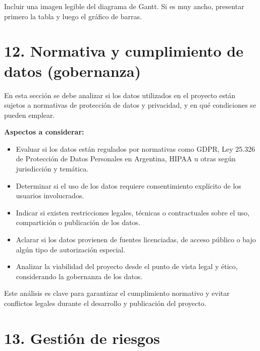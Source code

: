 \documentclass[
11pt, %
]{charter}
\begin{document}
Incluir una imagen legible del diagrama de Gantt. Si es muy ancho, presentar primero la tabla y luego el gráfico de barras.



\section{12. Normativa y cumplimiento de datos (gobernanza)}

En esta sección se debe analizar si los datos utilizados en el proyecto están sujetos a normativas de protección de datos y privacidad, y en qué condiciones se pueden emplear.

\textbf{Aspectos a considerar:}
\begin{itemize}
  \item Evaluar si los datos están regulados por normativas como GDPR, Ley 25.326 de Protección de Datos Personales en Argentina, HIPAA u otras según jurisdicción y temática.
  \item Determinar si el uso de los datos requiere consentimiento explícito de los usuarios involucrados.
  \item Indicar si existen restricciones legales, técnicas o contractuales sobre el uso, compartición o publicación de los datos.
  \item Aclarar si los datos provienen de fuentes licenciadas, de acceso público o bajo algún tipo de autorización especial.
  \item Analizar la viabilidad del proyecto desde el punto de vista legal y ético, considerando la gobernanza de los datos.
\end{itemize}

Este análisis es clave para garantizar el cumplimiento normativo y evitar conflictos legales durante el desarrollo y publicación del proyecto.


\section{13. Gestión de riesgos}
\label{sec:riesgos}
\end{document}
